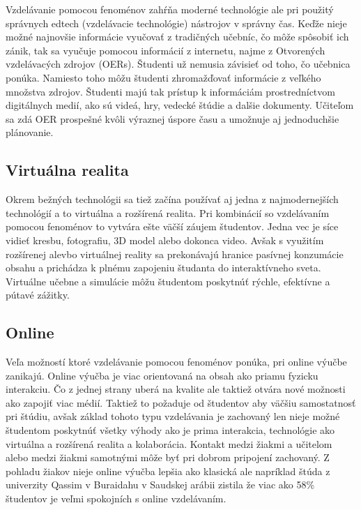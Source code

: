 \documentclass[11pt,slovak,a4paper]{article}
\begin{document}
Vzdelávanie pomocou fenoménov zahŕňa moderné technológie ale pri použitý správnych edtech (vzdelávacie technológie) nástrojov v správny čas.
Keďže nieje možné najnovšie informácie vyučovať z tradičných učebníc, čo môže spôsobiť ich zánik, tak sa vyučuje pomocou informácií z internetu, najme z
Otvorených vzdelávacých zdrojov (OERs). Študenti už nemusia závisieť od toho, čo učebnica ponúka. Namiesto toho môžu študenti zhromažďovať informácie z veľkého množstva zdrojov.
Študenti majú tak prístup k informáciám prostredníctvom digitálnych medií, ako sú videá, hry, vedecké štúdie a dalšie dokumenty. Učiteľom sa zdá OER prospešné kvôli výraznej úspore času a umožnuje aj jednoduchšie plánovanie.
\cite{fsew}

\subsection{Virtuálna realita}

Okrem bežných technológii sa tiež začína používať aj jedna z najmodernejších technológií a to virtuálna a rozšírená realita. Pri kombinácií so vzdelávaním pomocou fenoménov
to vytvára ešte väčší záujem študentov. Jedna vec je síce vidieť kresbu, fotografiu, 3D model alebo dokonca video. Avšak s využitím rozšírenej alevbo virtuálnej reality 
sa prekonávajú hranice pasívnej konzumácie obsahu a prichádza k plnému zapojeniu študanta do interaktívneho sveta. Virtuálne učebne a simulácie môžu študentom poskytnúť rýchle, efektívne a pútavé zážitky.
\cite{pbldc}
 
\subsection{Online}

Veľa možností ktoré vzdelávanie pomocou fenoménov ponúka, pri online výučbe zanikajú. Online výučba je viac orientovaná na obsah ako priamu fyzicku interakciu. Čo z jednej strany uberá na kvalite ale taktiež otvára nové možnosti
ako zapojiť viac médií. Taktiež to požaduje od študentov aby väčšiu samostatnosť pri štúdiu, avšak základ tohoto typu vzdelávania je zachovaný len nieje možné študentom poskytnúť všetky výhody ako je prima interakcia, technológie ako
virtuálna a rozšírená realita a kolaborácia. Kontakt medzi žiakmi a učitelom alebo medzi žiakmi samotnými môže byť pri dobrom pripojení zachovaný.
\cite{outdacc}
Z pohladu žiakov nieje online výučba lepšia ako klasická ale napríklad štúda \cite{ELZAINY} z univerzity Qassim v Buraidahu v Saudskej arábii zistila že viac ako 58\% študentov je veľmi spokojních s online vzdelávaním.
\end{document}
